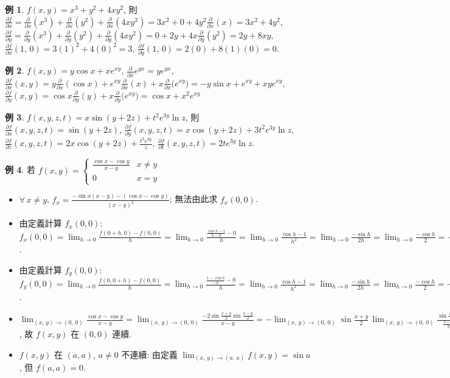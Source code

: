 \documentclass[12pt]{extarticle}
\newcommand{\ds}{\displaystyle}
\theoremstyle{definition}
\newtheorem*{ex}{例}
\newcommand{\pdiff}[2]{\frac{\partial #1}{\partial #2}}
\begin{document}
\begin{ex}
  $\ds f(x,y) = x^3 + y^2 + 4xy^2$, 則 $\ds\pdiff{f}{x} = \pdiff{}{x}(x^3) + \pdiff{}{x}(y^2) + \pdiff{}{x}(4xy^2) = 3x^2 + 0 + 4y^2\pdiff{}{x}(x) = 3x^2 + 4y^2$, $\ds\pdiff{f}{y} = \pdiff{}{y}(x^3) + \pdiff{}{y}(y^2) +\pdiff{}{y}(4xy^2) = 0 + 2y + 4x\pdiff{}{y}(y^2) = 2y + 8xy$, $\ds\pdiff{f}{x}(1,\,0) = 3(1)^2 + 4(0)^2 = 3$, $\ds\pdiff{f}{y}(1,\,0) = 2(0) + 8(1)(0) = 0$. 
\end{ex}

\begin{ex}
  $\ds f(x,y) = y\cos x + xe^{xy}$, $\ds\pdiff{}{x} e^{yx}=y e^{yx}$, $\ds\pdiff{f}{x}(x,y) = y\pdiff{}{x}(\cos x) + e^{xy}\pdiff{}{x}(x) + x\pdiff{}{x}\big(e^{xy}\big) = -y\sin x + e^{xy} + x y e^{xy}$, $\ds\pdiff{f}{y}(x,y) = \cos x\pdiff{}{y}(y) + x\pdiff{}{y}\big(e^{xy}\big) = \cos x + x^2e^{xy}$
\end{ex}

\begin{ex}
  $\ds f(x, y, z, t) = x\sin(y + 2z) + t^2 e^{3y}\ln z$, 則 $\ds\pdiff{f}{x}(x,y,z,t) = \sin(y+2z)$, $\ds\pdiff{f}{y}(x,y,z,t) = x\cos(y+2z) +3t^2e^{3y}\ln z$, $\ds\pdiff{f}{z}(x,y,z,t) = 2x \cos(y + 2z) +\frac{t^2e^{3y}}{z}$, $\ds\pdiff{f}{t}(x,y,z,t) = 2t e^{3y}\ln z$. 
\end{ex}

\begin{ex} 若 $\ds f(x,y) = \begin{cases}\frac{\cos x - \cos y}{x - y} & x\ne y\\ 0 & x=y\end{cases}$
  \begin{itemize}\setlength{\itemsep}{0pt}
    \item $\forall\,x\ne y$, $\ds f_x = \frac{-\sin x(x - y) - (\cos x - \cos y)}{(x - y)^2}$; 無法由此求 $f_x(0, 0)$. 
    \item 由定義計算 $\ds f_x(0, 0)$: $\ds f_x(0, 0) = \lim_{h\to 0}\frac{f(0 + h, 0) - f(0, 0)}{h} = \lim_{h\to 0}\frac{\frac{\cos h - 1}{h - 0} - 0}{h} = \lim_{h\to 0}\frac{\cos h-1}{h^2} = \lim_{h\to 0}\frac{-\sin h}{2h} = \lim_{h\to 0}\frac{-\cos h}{2} = -\frac{1}{2}$. 
    \item 由定義計算 $\ds f_y(0, 0)$: $\ds f_y(0, 0) = \lim_{h\to 0}\frac{f(0, 0 + h) - f(0, 0)}{h} = \lim_{h\to 0}\frac{\frac{1 - \cos h}{-h} - 0}{h} = \lim_{h\to 0}\frac{\cos h-1}{h^2} = \lim_{h\to 0}\frac{-\sin h}{2h} = \lim_{h\to 0}\frac{-\cos h}{2} = -\frac{1}{2}$. 
    \item $\ds\lim_{(x,\,y)\to (0,\,0)}\frac{\cos x - \cos y}{x - y} = \lim_{(x,\,y)\to (0,\,0)}\frac{-2\sin\frac{x + y}{2}\sin\frac{x - y}{2}}{x - y} = -\lim_{(x,\,y)\to (0,\,0)}\sin\frac{x + y}{2}\,\lim_{(x,\,y)\to (0,\,0)}\frac{\sin\frac{x - y}{2}}{\frac{x - y}{2}} = 0$, 故 $f(x, y)$ 在 $(0, 0)$ 連續. 
    \item $\ds f(x, y)$ 在 $(a, a)$, $a\ne 0$ 不連續: 由定義 $\ds\lim_{(x,\,y)\to(a,\,a)}f(x, y) = \sin a$, 但 $f(a, a) = 0$. 
  \end{itemize}
\end{ex}
\end{document}
